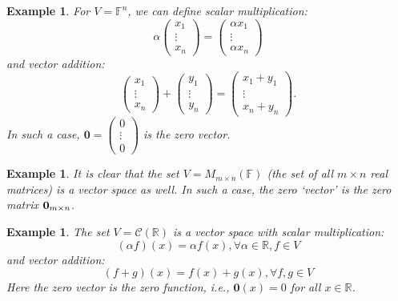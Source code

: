 \documentclass[11pt]{article}
\newtheorem{example}[theorem]{Example}
\begin{document}
\begin{example} For \(V = {\mathbb{F}}^n\), we can define scalar multiplication:
\[
\alpha \left( \begin{matrix} {x}_1 \\  \vdots \\  {x}_n \end{matrix}\right)  = \left( \begin{matrix} \alpha {x}_1 \\  \vdots \\  \alpha {x}_n \end{matrix}\right)
\]
and vector addition:
\[
\left( \begin{matrix} {x}_1 \\  \vdots \\  {x}_n \end{matrix}\right)  + \left( \begin{matrix} {y}_1 \\  \vdots \\  {y}_n \end{matrix}\right)  = \left( \begin{matrix} {x}_1 + {y}_1 \\  \vdots \\  {x}_n + {y}_n \end{matrix}\right).
\]
In such a case,
\(
\mathbf{0} = \left( \begin{matrix} 0 \\  \vdots \\  0 \end{matrix}\right)
\) is the zero vector.
\end{example}

\begin{example}
It is clear that the set \(V = {M}_{m \times  n}\left( \mathbb{F}\right)\) (the set of all \(m \times  n\) real matrices) is a vector space as well. In such a case, the zero `vector' is the zero matrix ${\bf 0}_{m \times n}$.
\end{example}

\begin{example}
The set \(V = \mathcal{C}\left( \mathbb{R}\right)\) is a vector space with scalar multiplication:
\[
\left( {\alpha f}\right) \left( x\right)  = {\alpha f}\left( x\right) ,\forall \alpha  \in  \mathbb{R},f \in  V
\]    
and vector addition:
\[
\left( {f + g}\right) \left( x\right)  = f\left( x\right)  + g\left( x\right) ,\forall f,g \in  V
\]
Here the zero vector is the zero function, i.e., \(\mathbf{0}\left( x\right)  = 0\) for all \(x \in  \mathbb{R}\).
\end{example}
\end{document}
